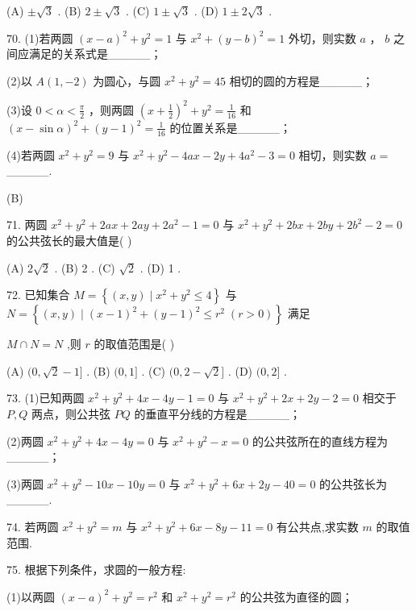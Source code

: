 \documentclass[10pt]{article}
\begin{document}
(A) \(\pm  \sqrt{3}\) . (B) \(2 \pm  \sqrt{3}\) . (C) \(1 \pm  \sqrt{3}\) . (D) \(1 \pm  2\sqrt{3}\) .

70. (1)若两圆 \({\left( x - a\right) }^{2} + {y}^{2} = 1\) 与 \({x}^{2} + {\left( y - b\right) }^{2} = 1\) 外切，则实数 \(a\) ， \(b\) 之间应满足的关系式是\_\_\_\_\_；

(2)以 \(A\left( {1, - 2}\right)\) 为圆心，与圆 \({x}^{2} + {y}^{2} = {45}\) 相切的圆的方程是\_\_\_\_\_；

(3)设 \(0 < \alpha  < \frac{\pi }{2}\) ，则两圆 \({\left( x + \frac{1}{2}\right) }^{2} + {y}^{2} = \frac{1}{16}\) 和 \({\left( x - \sin \alpha \right) }^{2} + {\left( y - 1\right) }^{2} = \frac{1}{16}\) 的位置关系是\_\_\_\_\_；

(4)若两圆 \({x}^{2} + {y}^{2} = 9\) 与 \({x}^{2} + {y}^{2} - {4ax} - {2y} + 4{a}^{2} - 3 = 0\) 相切，则实数 \(a =\) \_\_\_\_\_.

(B)

71. 两圆 \({x}^{2} + {y}^{2} + {2ax} + {2ay} + 2{a}^{2} - 1 = 0\) 与 \({x}^{2} + {y}^{2} + {2bx} + {2by} + 2{b}^{2} - 2 = 0\) 的公共弦长的最大值是( )

(A) \(2\sqrt{2}\) . (B) 2 . (C) \(\sqrt{2}\) . (D) 1 .

72. 已知集合 \(M = \left\{  {\left( {x,y}\right)  \mid  {x}^{2} + {y}^{2} \leq  4}\right\}\) 与 \(N = \left\{  {\left( {x,y}\right)  \mid  {\left( x - 1\right) }^{2} + {\left( y - 1\right) }^{2} \leq  {r}^{2}\;\left( {r > 0}\right) }\right\}\) 满足

\(M \cap  N = N\) ,则 \(r\) 的取值范围是( )

(A) \((0,\sqrt{2} - 1\rbrack\) . (B) \((0,1\rbrack\) . (C) \((0,2 - \sqrt{2}\rbrack\) . (D) \((0,2\rbrack\) .

73. (1)已知两圆 \({x}^{2} + {y}^{2} + {4x} - {4y} - 1 = 0\) 与 \({x}^{2} + {y}^{2} + {2x} + {2y} - 2 = 0\) 相交于 \(P,Q\) 两点，则公共弦 \({PQ}\) 的垂直平分线的方程是\_\_\_\_\_；

(2)两圆 \({x}^{2} + {y}^{2} + {4x} - {4y} = 0\) 与 \({x}^{2} + {y}^{2} - x = 0\) 的公共弦所在的直线方程为\_\_\_\_\_；

(3)两圆 \({x}^{2} + {y}^{2} - {10x} - {10y} = 0\) 与 \({x}^{2} + {y}^{2} + {6x} + {2y} - {40} = 0\) 的公共弦长为\_\_\_\_\_.

74. 若两圆 \({x}^{2} + {y}^{2} = m\) 与 \({x}^{2} + {y}^{2} + {6x} - {8y} - {11} = 0\) 有公共点,求实数 \(m\) 的取值范围.

75. 根据下列条件，求圆的一般方程:

(1)以两圆 \({\left( x - a\right) }^{2} + {y}^{2} = {r}^{2}\) 和 \({x}^{2} + {y}^{2} = {r}^{2}\) 的公共弦为直径的圆；
\end{document}
